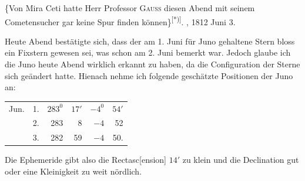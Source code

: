 \{Von Mira Ceti hatte Herr Professor \textsc{Gauss} diesen Abend mit seinem Cometensucher gar keine Spur finden können\}\textsuperscript{[*)]}.
\medskip{}, 1812 Juni 3.

Heute Abend bestätigte sich, dass der am 1. Juni für Juno gehaltene Stern bloss ein Fixstern gewesen sei, was schon am 2. Juni bemerkt war. Jedoch glaube ich die Juno heute Abend wirklich erkannt zu haben, da die Configuration der Sterne sich geändert hatte. Hienach nehme ich folgende geschätzte Positionen der Juno an:
\begin{center}\begin{tabular}{lr rrrr}
Jun.&1.&$283^0$&$17'$&$-4^0$&$54'$\\
&2.&283&8&$-4$&52\\
&3.&282&59&$-4$&50.
\end{tabular}\end{center}
\noindent\hspace*{\parindent}Die Ephemeride gibt also die Rectasc[ension] $14'$ zu klein und die Declination gut oder eine Kleinigkeit zu weit nördlich.

